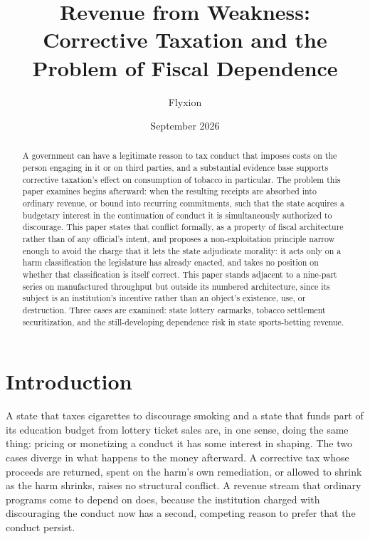 \documentclass[11pt]{article}
\title{Revenue from Weakness: Corrective Taxation and the Problem of Fiscal Dependence}
\author{Flyxion}
\affil{Independent Researcher}
\date{September 2026}
\begin{document}
\maketitle

\begin{abstract}
A government can have a legitimate reason to tax conduct that imposes costs on the person engaging in it or on third parties, and a substantial evidence base supports corrective taxation's effect on consumption of tobacco in particular. The problem this paper examines begins afterward: when the resulting receipts are absorbed into ordinary revenue, or bound into recurring commitments, such that the state acquires a budgetary interest in the continuation of conduct it is simultaneously authorized to discourage. This paper states that conflict formally, as a property of fiscal architecture rather than of any official's intent, and proposes a non-exploitation principle narrow enough to avoid the charge that it lets the state adjudicate morality: it acts only on a harm classification the legislature has already enacted, and takes no position on whether that classification is itself correct. This paper stands adjacent to a nine-part series on manufactured throughput but outside its numbered architecture, since its subject is an institution's incentive rather than an object's existence, use, or destruction. Three cases are examined: state lottery earmarks, tobacco settlement securitization, and the still-developing dependence risk in state sports-betting revenue.
\end{abstract}

\section{Introduction}

A state that taxes cigarettes to discourage smoking and a state that funds part of its education budget from lottery ticket sales are, in one sense, doing the same thing: pricing or monetizing a conduct it has some interest in shaping. The two cases diverge in what happens to the money afterward. A corrective tax whose proceeds are returned, spent on the harm's own remediation, or allowed to shrink as the harm shrinks, raises no structural conflict. A revenue stream that ordinary programs come to depend on does, because the institution charged with discouraging the conduct now has a second, competing reason to prefer that the conduct persist.
\end{document}
